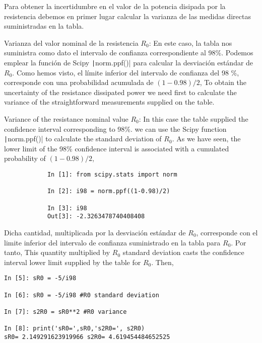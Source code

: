 \begin{paracol}{2}
Para obtener la incertidumbre en el valor de la potencia disipada por la resistencia debemos en primer lugar calcular la varianza de las medidas directas suministradas en la tabla.
 
\textbullet Varianza del valor nominal de la resistencia $R_0$: En este caso, la tabla nos suministra como dato el intervalo de confianza correspondiente al 98\%.  Podemos emplear la función de Scipy \texttt|norm.ppf()| para calcular la desviación estándar de $R_0$. Como hemos visto, el límite inferior del intervalo de confianza del 98 \%, corresponde con una probabilidad acumulada de $(1-0.98)/2$,
\switchcolumn
To obtain the uncertainty of the resistance dissipated power we need first to calculate the variance of the straightforward measurements supplied on the table.

\textbullet Variance of the resistance nominal value $R_0$: In this case the table supplied the confidence interval corresponding to 98\%. we can use the Scipy function \texttt|norm.ppf()| to calculate the standard deviation of $R_0$. As we have seen, the lower limit of the 98\% confidence interval is associated with a cumulated probability of $(1-0.98)/2$,   
\end{paracol}

\begin{center}
	\begin{minipage}{\textwidth}
		\begin{verbatim}
			In [1]: from scipy.stats import norm 

			In [2]: i98 = norm.ppf((1-0.98)/2)

			In [3]: i98
			Out[3]: -2.3263478740408408
		\end{verbatim}
	\end{minipage}
\end{center}

\begin{paracol}{2}
Dicha cantidad, multiplicada por la desviación estándar de $R_0$, corresponde con el limite inferior del intervalo de confianza suministrado en la tabla  para $R_0$. Por tanto,
\switchcolumn
This quantity multiplied by $R_0$ standard deviation casts the confidence interval lower limit supplied by the table for $R_0$. Then,  
\end{paracol}
\begin{center}
	\begin{minipage}{0.5\textwidth}
		\begin{verbatim}
In [5]: sR0 = -5/i98

In [6]: sR0 = -5/i98 #R0 standard deviation 

In [7]: s2R0 = sR0**2 #R0 variance

In [8]: print('sR0=',sR0,'s2R0=', s2R0)
sR0= 2.149291623919966 s2R0= 4.619454484652525
		\end{verbatim}
	\end{minipage}
\end{center}


